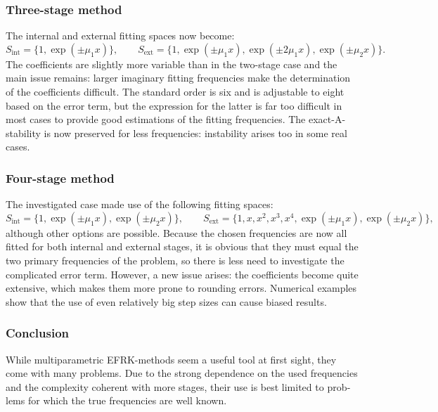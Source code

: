 \documentclass[12pt]{article}
\begin{document}
\begin{otherlanguage}{english}
\subsubsection{Three-stage method}
The internal and external fitting spaces now become:
\[S_{\textrm{int}}=\{1,\exp(\pm\mu_1x)\},\qquad S_{\textrm{ext}}=\{1,\exp(\pm\mu_1x),\exp(\pm2\mu_1x),\exp(\pm\mu_2x)\}.\]
The coefficients are slightly more variable than in the two-stage case and the main issue remains: larger imaginary fitting frequencies make the determination of the coefficients difficult. The standard order is six and is adjustable to eight based on the error term, but the expression for the latter is far too difficult in most cases to provide good estimations of the fitting frequencies. The exact-A-stability is now preserved for less frequencies: instability arises too in some real cases.

\subsubsection{Four-stage method}
The investigated case made use of the following fitting spaces:
\[S_{\textrm{int}}=\{1,\exp(\pm\mu_1x),\exp(\pm\mu_2x)\},\qquad S_{\textrm{ext}}=\{1,x,x^2,x^3,x^4,\exp(\pm\mu_1x),\exp(\pm\mu_2x)\},\]
although other options are possible. Because the chosen frequencies are now all fitted for both internal and external stages, it is obvious that they must equal the two primary frequencies of the problem, so there is less need to investigate the complicated error term. However, a new issue arises: the coefficients become quite extensive, which makes them more prone to rounding errors. Numerical examples show that the use of even relatively big step sizes can cause biased results.

\subsubsection{Conclusion}
While multiparametric EFRK-methods seem a useful tool at first sight, they come with many problems. Due to the strong dependence on the used frequencies and the complexity coherent with more stages, their use is best limited to problems for which the true frequencies are well known.

\end{otherlanguage}
\end{document}
